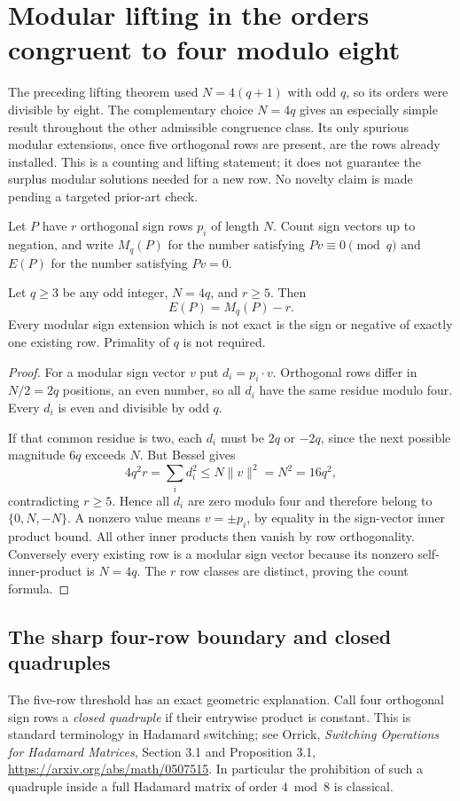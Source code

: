 \section{Modular lifting in the orders congruent to four modulo eight}
\label{sec:four-mod-eight-lifting}

The preceding lifting theorem used $N=4(q+1)$ with odd $q$, so its
orders were divisible by eight. The complementary choice $N=4q$
gives an especially simple result throughout the other admissible
congruence class. Its only spurious modular extensions, once five
orthogonal rows are present, are the rows already installed.
This is a counting and lifting statement; it does not guarantee the
surplus modular solutions needed for a new row. No novelty claim is
made pending a targeted prior-art check.

Let $P$ have $r$ orthogonal sign rows $p_i$ of length $N$. Count sign
vectors up to negation, and write $M_q(P)$ for the number satisfying
$Pv\equiv0\pmod q$ and $E(P)$ for the number satisfying $Pv=0$.

\begin{theorem}
Let $q\ge3$ be any odd integer, $N=4q$, and $r\ge5$. Then
\[
 \boxed{E(P)=M_q(P)-r.}
\]
Every modular sign extension which is not exact is the sign or
negative of exactly one existing row. Primality of $q$ is not required.
\end{theorem}
\begin{proof}
For a modular sign vector $v$ put $d_i=p_i\cdot v$.
Orthogonal rows differ in $N/2=2q$ positions, an even number, so
all $d_i$ have the same residue modulo four. Every $d_i$ is even
and divisible by odd $q$.

If that common residue is two, each $d_i$ must be $2q$ or $-2q$,
since the next possible magnitude $6q$ exceeds $N$. But Bessel gives
\[
 4q^2r=\sum_i d_i^2\le N\|v\|^2=N^2=16q^2,
\]
contradicting $r\ge5$. Hence all $d_i$ are zero modulo four and
therefore belong to $\{0,N,-N\}$. A nonzero value means
$v=\pm p_i$, by equality in the sign-vector inner product bound.
All other inner products then vanish by row orthogonality.
Conversely every existing row is a modular sign vector because its
nonzero self-inner-product is $N=4q$. The $r$ row classes are distinct,
proving the count formula.
\end{proof}

\subsection{The sharp four-row boundary and closed quadruples}
The five-row threshold has an exact geometric explanation. Call four
orthogonal sign rows a \emph{closed quadruple} if their entrywise
product is constant. This is standard terminology in Hadamard
switching; see Orrick, \emph{Switching Operations for Hadamard
Matrices}, Section 3.1 and Proposition 3.1,
\url{https://arxiv.org/abs/math/0507515}.
In particular the prohibition of such a quadruple inside a full
Hadamard matrix of order $4\bmod8$ is classical.

